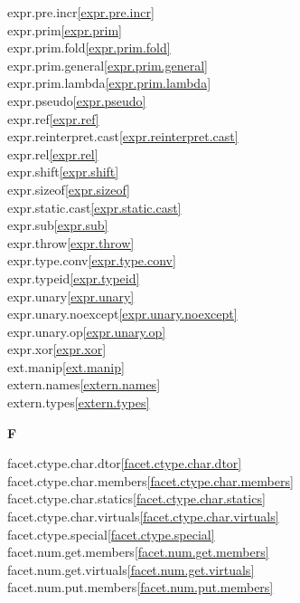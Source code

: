 \begin{multicols}{2}
expr.pre.incr\quad\ref{expr.pre.incr}\\
expr.prim\quad\ref{expr.prim}\\
expr.prim.fold\quad\ref{expr.prim.fold}\\
expr.prim.general\quad\ref{expr.prim.general}\\
expr.prim.lambda\quad\ref{expr.prim.lambda}\\
expr.pseudo\quad\ref{expr.pseudo}\\
expr.ref\quad\ref{expr.ref}\\
expr.reinterpret.cast\quad\ref{expr.reinterpret.cast}\\
expr.rel\quad\ref{expr.rel}\\
expr.shift\quad\ref{expr.shift}\\
expr.sizeof\quad\ref{expr.sizeof}\\
expr.static.cast\quad\ref{expr.static.cast}\\
expr.sub\quad\ref{expr.sub}\\
expr.throw\quad\ref{expr.throw}\\
expr.type.conv\quad\ref{expr.type.conv}\\
expr.typeid\quad\ref{expr.typeid}\\
expr.unary\quad\ref{expr.unary}\\
expr.unary.noexcept\quad\ref{expr.unary.noexcept}\\
expr.unary.op\quad\ref{expr.unary.op}\\
expr.xor\quad\ref{expr.xor}\\
ext.manip\quad\ref{ext.manip}\\
extern.names\quad\ref{extern.names}\\
extern.types\quad\ref{extern.types}\\
\par \textbf{F}\par
facet.ctype.char.dtor\quad\ref{facet.ctype.char.dtor}\\
facet.ctype.char.members\quad\ref{facet.ctype.char.members}\\
facet.ctype.char.statics\quad\ref{facet.ctype.char.statics}\\
facet.ctype.char.virtuals\quad\ref{facet.ctype.char.virtuals}\\
facet.ctype.special\quad\ref{facet.ctype.special}\\
facet.num.get.members\quad\ref{facet.num.get.members}\\
facet.num.get.virtuals\quad\ref{facet.num.get.virtuals}\\
facet.num.put.members\quad\ref{facet.num.put.members}\\

\end{multicols}

